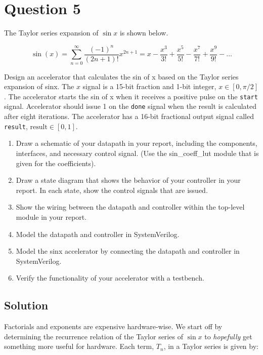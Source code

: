 \documentclass[../main.tex]{subfiles}
\begin{document}
\newpage

\section{Question 5}

The Taylor series expansion of $\sin x$ is shown below.

$$
    \sin(x) = \sum_{n = 0}^\infty \frac{(-1)^n}{(2n+1)!} x^{2n + 1} = x - \frac{x^3}{3!} + \frac{x^5}{5!} - \frac{x^7}{7!} + \frac{x^9}{9!} - \ldots
$$

Design an accelerator that calculates the sin of x based on the Taylor series expansion of sinx. The $x$ signal is a 15-bit fraction and 1-bit integer, $x \in [0, \pi/2]$. The accelerator starts the sin of x when it receives a positive pulse on the \lstinline{start} signal. Accelerator should issue 1 on the \lstinline{done} signal when the result is calculated after eight iterations. The accelerator has a 16-bit fractional output signal called \lstinline{result}, $\text{result} \in [0, 1]$.

\begin{enumerate}
    \item Draw a schematic of your datapath in your report, including the components, interfaces, and necessary control signal. (Use the sin\_coeff\_lut module that is given for the coefficients).
    \item Draw a state diagram that shows the behavior of your controller in your report. In each state, show the control signals that are issued.
    \item Show the wiring between the datapath and controller within the top-level module in your report.
    \item Model the datapath and controller in SystemVerilog.
    \item Model the sinx accelerator by connecting the datapath and controller in SystemVerilog.
    \item Verify the functionality of your accelerator with a testbench.
\end{enumerate}

\subsection*{Solution}

Factorials and exponents are expensive hardware-wise. We start off by determining the recurrence relation of the Taylor series of $\sin x$ to \textit{hopefully} get something more useful for hardware. Each term, $T_n$, in a Taylor series is given by:
\end{document}
